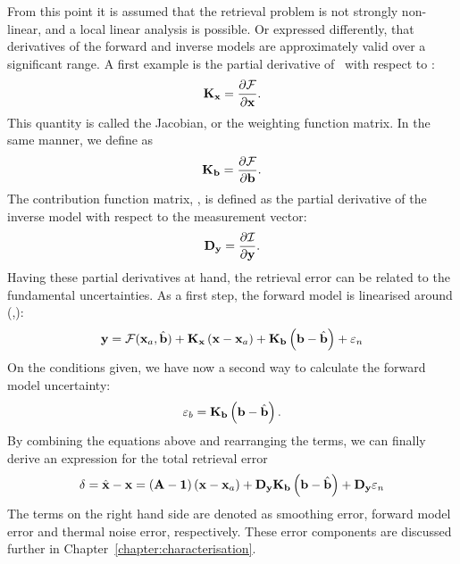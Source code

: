 From this point it is assumed that the retrieval problem is not strongly
non-linear, and a local linear analysis is possible. Or expressed differently,
that derivatives of the forward and inverse models are approximately valid over a
significant range. A first example is the partial derivative of \FrwMdl\ with
respect to \SttVct:
\begin{equation}
  \label{eq:kx}
  \mathbf{K}_{\mathbf{x}} = \frac{\partial\mathcal{F}}{\partial\mathbf{x}}.
\end{equation}
This quantity is called the Jacobian, or the weighting function matrix. In the
same manner, we define \aWfnMtr{\FrwMdlVct} as
\begin{equation}
  \label{eq:kb}
  \mathbf{K}_{\mathbf{b}} = \frac{\partial\mathcal{F}}{\partial\mathbf{b}}.
\end{equation}
The contribution function matrix, \CtrFncMtr, is defined as the partial
derivative of the inverse model with respect to the measurement vector:
\begin{equation}
  \label{eq:dy}
  \mathbf{D_y} = \frac{\partial\mathcal{I}}{\partial\mathbf{y}}.
\end{equation}
Having these partial derivatives at hand, the retrieval error can be related
to the fundamental uncertainties. As a first step, the forward model is
linearised around (,\FrwMdlVctHat):
\begin{equation}
  \label{eq:fmodel3}
  \mathbf{y} = \mathcal{F}(\mathbf{x}_{a},\hat{\mathbf{b}}) + 
  \mathbf{K}_{\mathbf{x}}\left(\mathbf{x}-\mathbf{x}_{a}\right) +
  \mathbf{K}_{\mathbf{b}}\left(\mathbf{b}-\hat{\mathbf{b}}\right) +
  \varepsilon_n
\end{equation}
On the conditions given, we have now a second way to calculate the forward
model uncertainty:
\begin{equation}
  \varepsilon_b = \mathbf{K}_{\mathbf{b}}\left(\mathbf{b}-\hat{\mathbf{b}}\right).
\end{equation}
By combining the equations above and rearranging the terms, we can finally
derive an expression for the total retrieval error
\begin{equation}
  \label{eq:delta}
  \delta = \hat{\mathbf{x}} - \mathbf{x} =  \left(\mathbf{A}-\mathbf{1}\right)
    \left(\mathbf{x}-\mathbf{x}_{a}\right) + 
    \mathbf{D_y}\mathbf{K}_{\mathbf{b}}\left(\mathbf{b}-\hat{\mathbf{b}}\right) +
    \mathbf{D_y}\varepsilon_n
\end{equation}
The terms on the right hand side are denoted as smoothing error, forward model
error and thermal noise error, respectively. These error components are
discussed further in Chapter~\ref{chapter:characterisation}.


